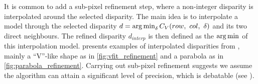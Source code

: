 It is common to add a sub-pixel refinement step, where a non-integer disparity is interpolated around the selected disparity. The main idea is to interpolate a model through the selected disparity $d=\operatorname*{arg\,min}_\delta C_V(row, ~col, ~\delta)$ and its two direct neighbours. The refined disparity $d_{interp}$ is then defined as the $\operatorname*{arg\,min}$ of this interpolation model.  presents examples of interpolated disparities from  \cite{haller_real-time_2010}, mainly a ``V''-like shape as in \ref{fig:vfit_refinement} and a parabola as in \ref{fig:parabola_refinement}. Carrying out sub-pixel refinement suggests we assume the algorithm can attain a significant level of precision, which is debatable (see ).

